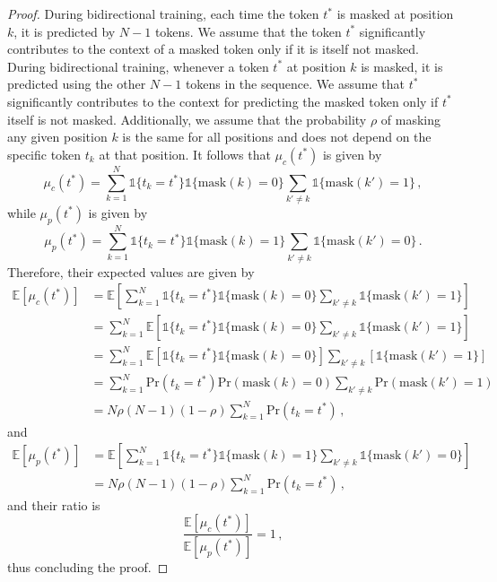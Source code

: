 \begin{proof}
During bidirectional training, each time the token $t^*$ is masked at position $k$, it is predicted by $N-1$ tokens.
%
We assume that the token $t^*$ significantly contributes to the context of a masked token only if it is itself not masked.
%
During bidirectional training, whenever a token $t^*$ at position 
$k$ is masked, it is predicted using the other $N-1$ tokens in the sequence.
%
We assume that $t^*$ significantly contributes to the context for predicting the masked token only if
$t^*$ itself is not masked.
%
Additionally, we assume that the probability $\rho$ of masking any given position $k$ is the same for all positions and does not depend on the specific token $t_k$ at that position.
%
It follows that $\mu_c(t^*)$ is given by 
%
\begin{equation}
\mu_c(t^*) = \sum_{k=1}^N\mathds{1}\{t_k = t^*\} \mathds{1}\{\text{mask}(k) = 0\}\sum_{k' \neq k} \mathds{1}\{\text{mask}(k') = 1\}  \,,
\end{equation}
%
while $\mu_p(t^*)$ is given by 
%
\begin{equation}
\mu_p(t^*) = \sum_{k=1}^N\mathds{1}\{t_k = t^*\} \mathds{1}\{\text{mask}(k) = 1\}\sum_{k' \neq k} \mathds{1}\{\text{mask}(k') = 0\}\,.
\end{equation}
%
Therefore, their expected values are given by 
%
\begin{equation}
\begin{split}
\mathbb{E}[\mu_c(t^*)] 
& =  \mathbb{E} \left[\sum_{k=1}^N\mathds{1}\{t_k = t^*\} \mathds{1}\{\text{mask}(k) = 0\}\sum_{k' \neq k} \mathds{1}\{\text{mask}(k') = 1\} \right] \\
& = \sum_{k=1}^N \mathbb{E} \left[\mathds{1}\{t_k = t^*\} \mathds{1}\{\text{mask}(k) = 0\}\sum_{k' \neq k} \mathds{1}\{\text{mask}(k') = 1\} \right]\\
& = \sum_{k=1}^N \mathbb{E} \left[\mathds{1}\{t_k = t^*\} \mathds{1}\{\text{mask}(k) = 0\}\right]\sum_{k' \neq k} \left[\mathds{1}\{\text{mask}(k') = 1\} \right]\\
& = \sum_{k=1}^N \text{Pr}(t_k = t^*) \text{Pr}(\text{mask}(k) = 0)\sum_{k' \neq k} \text{Pr}(\text{mask}(k') = 1) \\
& = N\rho(N-1)(1 - \rho) \sum_{k=1}^N \text{Pr}(t_k = t^*)\,,
\end{split}
\end{equation}
%
and
%
\begin{equation}
\begin{split}
\mathbb{E}[\mu_p(t^*)] 
& =  \mathbb{E} \left[\sum_{k=1}^N\mathds{1}\{t_k = t^*\} \mathds{1}\{\text{mask}(k) = 1\}\sum_{k' \neq k} \mathds{1}\{\text{mask}(k') = 0\} \right] \\
& = N\rho(N-1)(1 - \rho)\sum_{k=1}^N \text{Pr}(t_k = t^*)  \,,
\end{split}
\end{equation}
%
and their ratio is
\begin{equation}
     \frac{\mathbb{E}[\mu_c(t^*)]}{\mathbb{E}[\mu_p(t^*)]} = 1 \,,
\end{equation}
%
thus concluding the proof.
%












\end{proof}
